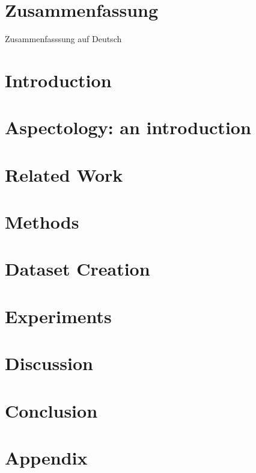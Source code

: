 \clearpage
\chapter*{Zusammenfassung}\label{c.zusammenfassung}
\foreignlanguage{ngerman}{
Zusammenfasssung auf Deutsch
}

\clearpage
\tableofcontents
\clearpage
\listoffigures
\clearpage
\listoftables

\clearpage
{} %
\chapter{Introduction}\label{c.introduction}


\chapter{Aspectology: an introduction}\label{c.aspectology}


\clearpage
\chapter{Related Work}\label{c.related}


\clearpage
\chapter{Methods}\label{c.methods}


\clearpage
\chapter{Dataset Creation}\label{c.dataset}


\clearpage
\chapter{Experiments}\label{c.experiments}


\clearpage
\chapter{Discussion}\label{c.discussion}


\clearpage 
\chapter{Conclusion}\label{c.conclusion}


\clearpage
\appendix
\chapter{Appendix}


\clearpage
%



